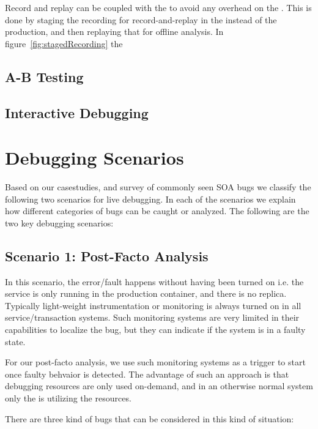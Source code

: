 Record and replay can be coupled with the \debugcontainer to avoid any overhead on the \productioncontainer.
This is done by staging the recording for record-and-replay in the \debugcontainer instead of the production, and then replaying that for offline analysis.
In figure~\ref{fig:stagedRecording} the 

\subsection{A-B Testing}

\subsection{Interactive Debugging}

\section{Debugging Scenarios}

Based on our casestudies, and survey of commonly seen SOA bugs we classify the following two scenarios for live debugging. In each of the scenarios we explain how different categories of bugs can be caught or analyzed.
The following are the two key debugging scenarios:

\subsection{Scenario 1: Post-Facto Analysis}

In this scenario, the error/fault happens without \livedebugging having been turned on i.e. the service is only running in the production container, and there is no replica.
Typically light-weight instrumentation or monitoring is always turned on in all service/transaction systems. 
Such monitoring systems are very limited in their capabilities to localize the bug, but they can indicate if the system is in a faulty state.

For our post-facto analysis, we use such monitoring systems as a trigger to start \livedebugging once faulty behvaior is detected. 
The advantage of such an approach is that debugging resources are only used on-demand, and in an otherwise normal system only the \productioncontainer is utilizing the resources.


There are three kind of bugs that can be considered in this kind of situation:

